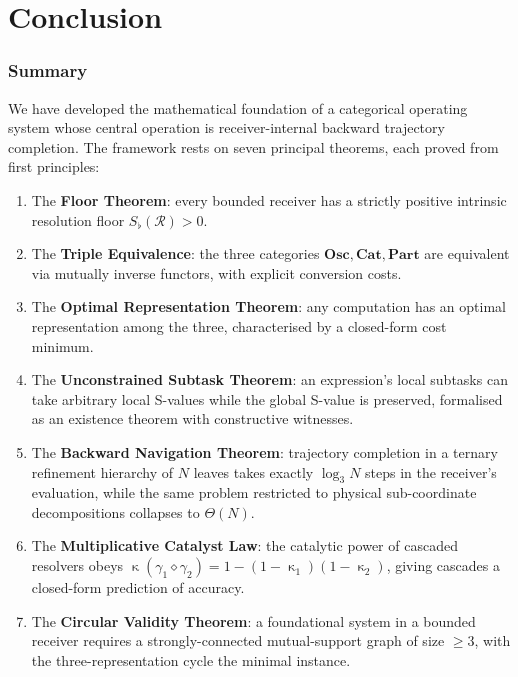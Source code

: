 \documentclass[twocolumn,a4paper]{article}
\DeclareMathOperator{\catpow}{\kappa}
\newcommand{\receiver}{\mathcal{R}}
\newcommand{\Sfloor}{S_{\flat}}
\begin{document}
\part{Conclusion}

\section{Summary}

We have developed the mathematical foundation of a categorical operating system whose central operation is receiver-internal backward trajectory completion. The framework rests on seven principal theorems, each proved from first principles:

\begin{enumerate}[nosep,leftmargin=*]
\item The \textbf{Floor Theorem}: every bounded receiver has a strictly positive intrinsic resolution floor $\Sfloor(\receiver)>0$.
\item The \textbf{Triple Equivalence}: the three categories $\mathbf{Osc},\mathbf{Cat},\mathbf{Part}$ are equivalent via mutually inverse functors, with explicit conversion costs.
\item The \textbf{Optimal Representation Theorem}: any computation has an optimal representation among the three, characterised by a closed-form cost minimum.
\item The \textbf{Unconstrained Subtask Theorem}: an expression's local subtasks can take arbitrary local S-values while the global S-value is preserved, formalised as an existence theorem with constructive witnesses.
\item The \textbf{Backward Navigation Theorem}: trajectory completion in a ternary refinement hierarchy of $N$ leaves takes exactly $\log_{3}N$ steps in the receiver's evaluation, while the same problem restricted to physical sub-coordinate decompositions collapses to $\Theta(N)$.
\item The \textbf{Multiplicative Catalyst Law}: the catalytic power of cascaded resolvers obeys $\catpow(\gamma_{1}\diamond\gamma_{2})=1-(1-\catpow_{1})(1-\catpow_{2})$, giving cascades a closed-form prediction of accuracy.
\item The \textbf{Circular Validity Theorem}: a foundational system in a bounded receiver requires a strongly-connected mutual-support graph of size $\geq 3$, with the three-representation cycle the minimal instance.
\end{enumerate}
\end{document}
